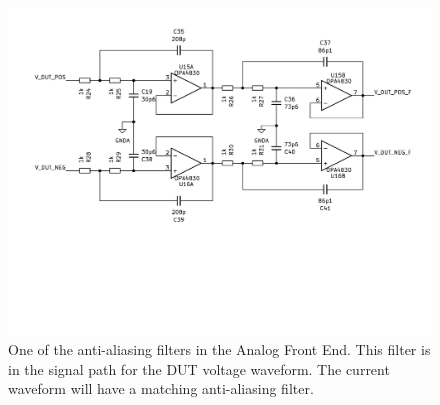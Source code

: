  \begin{figure}[H]
    \centering
    \includegraphics[clip, trim=0 200 0 0, width=1\textwidth]{Sections/7_SystemDesign/Figures/7_1_4_AAFilterSch.pdf}
    \caption{One of the anti-aliasing filters in the Analog Front End. This filter is in the signal path for the DUT voltage waveform. The current waveform will have a matching anti-aliasing filter.}
    \label{fig_7_1_4_AAFILTVDUT}
\end{figure}


